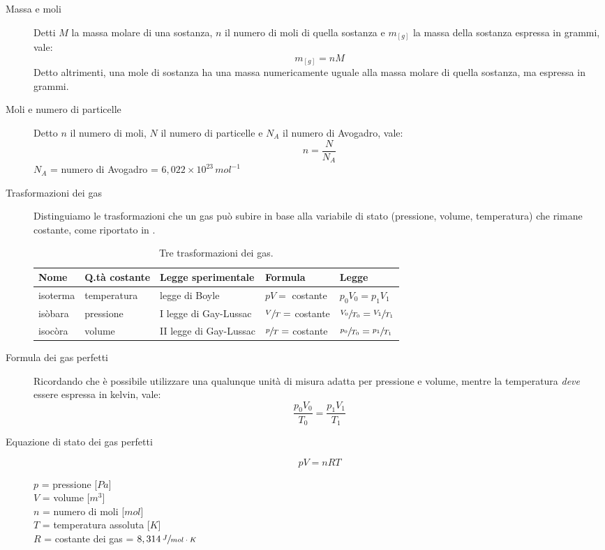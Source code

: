 \documentclass[a4paper,11pt,italian]{article}
\begin{document}
\begin{description}
  \item[Massa e moli]
  Detti $ M $ la massa molare di una sostanza, $ n $  il numero di moli di quella sostanza e $ m_{[g]} $ la massa della sostanza espressa in grammi, vale: 
  \[ m_{[g]} = n M \]
  Detto altrimenti, una mole di sostanza ha una massa numericamente uguale alla massa molare di quella sostanza, ma espressa in grammi.
  
  \item[Moli e numero di particelle]
  Detto $ n $ il numero di moli, $ N $ il numero di particelle e $ N_A $ il numero di Avogadro, vale: 
  \[ n = \frac{N}{N_A} \]
  $ N_A $ = numero di Avogadro = $ 6,022 \times 10^{23} \, mol^{-1} $
  
  \item[Trasformazioni dei gas]
  Distinguiamo le trasformazioni che un gas può subire in base alla variabile di stato (pressione, volume, temperatura) che rimane costante, come riportato in .
  
  \begin{table}[htb]\centering
  \begin{tabular}{lllll}\toprule
     \textbf{Nome}  & \textbf{Q.tà costante}  & \textbf{Legge sperimentale} & \textbf{Formula}            & \textbf{Legge}\\\midrule
     isoterma       & temperatura             & legge di Boyle              & $ pV= $ costante            & $ p_0V_0 = p_1V_1  $\\\addlinespace[.2em]
     isòbara        & pressione               & I legge di Gay-Lussac       & $ \sfrac{V}{T} = $ costante & $ \sfrac{V_0}{T_0} = \sfrac{V_1}{T_1} $\\\addlinespace[.2em]
     isocòra        & volume                  & II legge di Gay-Lussac      & $ \sfrac{p}{T} = $ costante & $ \sfrac{p_0}{T_0} = \sfrac{p_1}{T_1} $\\\bottomrule
   \end{tabular}
   \caption{Tre trasformazioni dei gas.}
  \label{tab:trasformazioni}
   \end{table}
  
  \item[Formula dei gas perfetti]
  Ricordando che è possibile utilizzare una qualunque unità di misura adatta per pressione e volume, mentre la temperatura \emph{deve} essere espressa in kelvin, vale: 
  \[ \dfrac{p_0 V_0}{T_0} = \dfrac{p_1 V_1}{T_1} \]
  
  \item[Equazione di stato dei gas perfetti]
  \[ pV = nRT \]
  \begin{multicols}{2}
  $ p $ = pressione [$ Pa $]\\
  $ V $ = volume [$ m^3 $]\\
  $ n $ = numero di moli [$ mol $]\\
  $ T $ = temperatura assoluta [$ K $]\\
  $ R $ = costante dei gas = $ 8,314 \, \sfrac{J}{mol \cdot K} $
  \end{multicols}
\end{description}
\end{document}
